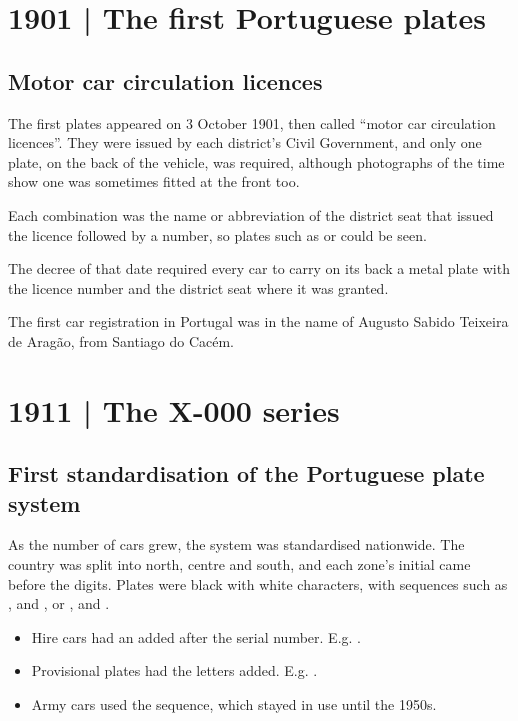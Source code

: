 \section{1901 | The first Portuguese plates}
\subsection*{Motor car circulation licences}

The first plates appeared on 3 October 1901, then called “motor car circulation
licences”. They were issued by each district's Civil Government, and only one
plate, on the back of the vehicle, was required, although photographs of the
time show one was sometimes fitted at the front too.

Each combination was the name or abbreviation of the district seat that issued
the licence followed by a number, so plates such as  or
 could be seen.

The decree of that date required every car to carry on its back a metal plate
with the licence number and the district seat where it was granted.

The first car registration in Portugal was in the name of Augusto Sabido
Teixeira de Aragão, from Santiago do Cacém.

\section{1911 | The X-000 series}
\subsection*{First standardisation of the Portuguese plate system}

As the number of cars grew, the system was standardised nationwide. The country
was split into north, centre and south, and each zone's initial came before the
digits. Plates were black with white characters, with sequences such as
,  and , or ,
 and .


\begin{itemize}
  \item Hire cars had an  added after the serial number.
        E.g. .
  \item Provisional plates had the letters  added.
        E.g. .
  \item Army cars used the  sequence, which stayed in use until
        the 1950s.
\end{itemize}

